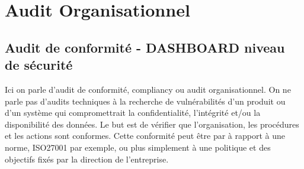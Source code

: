 \section {Audit Organisationnel}
\subsection{Audit de conformité - DASHBOARD niveau de sécurité}

Ici on parle d'audit de conformité, compliancy ou audit organisationnel. On ne parle pas d'audits techniques à la recherche de vulnérabilités d'un produit ou d'un système qui compromettrait la confidentialité, l'intégrité et/ou la disponibilité des données. Le but est de vérifier que l'organisation, les procédures et les actions sont conformes. Cette conformité peut être par à rapport à une norme, ISO27001 par exemple, ou plus simplement à une politique et des objectifs fixés par la direction de l'entreprise.

